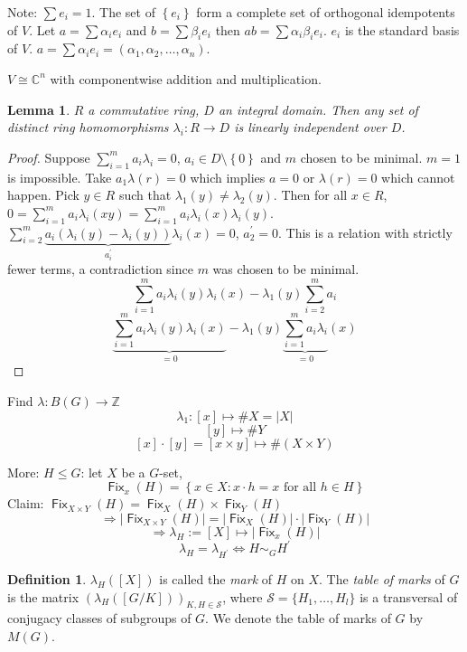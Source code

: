 \documentclass[12pt]{amsart}
\newtheorem{lemma}[theorem]{Lemma}
\theoremstyle{definition}
\newtheorem{definition}[theorem]{Definition}
\DeclareMathOperator{\Fix}{\mathsf{Fix}}
\newcommand{\Size}[1]{\left| #1 \right|}
\begin{document}
Note: $\sum{e_{i}} = 1$. The set of $\left\{ e_{i} \right\}$ form a complete set of orthogonal idempotents of $V$. Let $a = \sum{\alpha_{i}}{e_{i}}$ and $b = \sum{\beta_{i}}{e_{i}}$ then $ab = \sum{\alpha_{i} \beta_{i}}{e_{i}}$. $e_{i}$ is the standard basis of $V$. $a = \sum{\alpha_{i}}{e_{i}} = \left( \alpha_{1}, \alpha_{2}, \ldots, \alpha_{n} \right)$.

$V \cong \mathbb{C}^{n}$ with componentwise addition and multiplication.

\begin{lemma}
$R$ a commutative ring, $D$ an integral domain. Then any set of distinct ring homomorphisms $\lambda_{i} : R \rightarrow D$ is linearly independent over $D$.
\end{lemma}

\begin{proof}
Suppose $\sum_{i = 1}^{m} {a_{i}}{\lambda_{i}} = 0$, $a_{i} \in D \setminus \left\{ 0 \right\}$ and $m$ chosen to be minimal.
$m = 1$ is impossible. Take $a_{1} \lambda(r) = 0$ which implies $a = 0$ or $\lambda(r) = 0$ which cannot happen. Pick $y \in R$ such that $\lambda_{1} (y) \neq \lambda_{2} (y)$. Then for all $x \in R$, $0 =  \sum^{m}_{i = 1} {a_{i}}{\lambda_{i} (xy)} = \sum^{m}_{i = 1} {a_{i}} {\lambda_{i} (x) \lambda_{i} (y)}$. $\sum^{m}_{i = 2} \underbrace{a_{i} \left(\lambda_{i}(y) - \lambda_{i} (y) \right)}_{a^{'}_{i}} \lambda_{i} (x) = 0$, $a^{'}_{2} = 0$. This is a relation with strictly fewer terms, a contradiction since $m$ was chosen to be minimal.
$$\sum^{m}_{i = 1} { a_{i}} {\lambda_{i} (y) \lambda_{i} (x)} - \lambda_{1} (y) \sum^{m}_{i = 2} {a_{i}}$$
$$\underbrace{\sum^{m}_{i = 1} {a_{i}}{\lambda_{i}(y) \lambda_{i}(x)}}_{ = 0} - \lambda_{1}(y) \underbrace{\sum^{m}_{i = 1} {a_{i}}{\lambda_{i}}}_{ = 0} (x)$$
\end{proof}

Find $\lambda: B(G) \rightarrow \mathbb{Z}$
$$\lambda_{1}: [x] \mapsto \# X = \Size{X}$$
$$[y] \mapsto \# Y$$
$$[x] \cdot [y] = [x \times y] \mapsto \# \left(X \times Y \right)$$

More: $H \leq G$: let $X$ be a $G$-set,
$$\Fix_{x} \left( H \right) = \left\{ x \in X : x \cdot h = x \text{ for all } h \in H \right\}$$
Claim: $\Fix_{X \times Y} (H) = \Fix_{X} (H) \times \Fix_{Y} (H)$
$$\Rightarrow \Size{\Fix_{X \times Y} (H)} = \Size{\Fix_{X}(H)} \cdot \Size{\Fix_{Y} (H)}$$
$$\Rightarrow \lambda_{H}:= [X] \mapsto \Size{\Fix_{x}(H)}$$
$$\lambda_{H} = \lambda_{H^{'}} \Leftrightarrow H \sim_{G} H^{'}$$

\begin{definition}
$\lambda_H([X])$ is called the \emph{mark} of $H$ on $X$.  The \emph{table of marks} of $G$ is the matrix $(\lambda_H([G/K]))_{K, H\in\mathcal{S}}$, where $\mathcal{S}=\{H_1,\ldots,H_l\}$ is a transversal of conjugacy classes of subgroups of $G$.  We denote the table of marks of $G$ by $M(G)$.
\end{definition}
\end{document}
